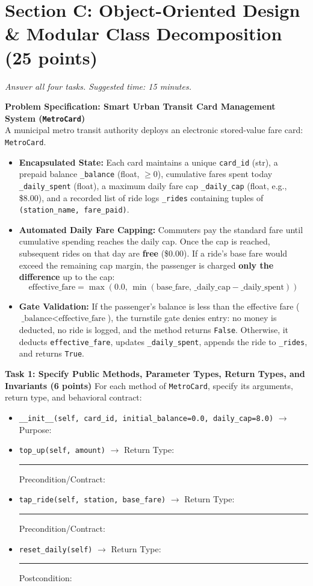 \documentclass[11pt,a4paper]{article}
\begin{document}
\section*{Section C: Object-Oriented Design \& Modular Class Decomposition \hfill \normalsize\normalfont(25 points)}
\textit{Answer all four tasks. Suggested time: 15 minutes.}
\begin{tcolorbox}[colback=boxbg,colframe=secondaryteal,arc=1.5mm,boxrule=0.6pt,top=1.5mm,bottom=1.5mm]
\textbf{Problem Specification: Smart Urban Transit Card Management System (\texttt{MetroCard})}\\[0.5mm]
\small
A municipal metro transit authority deploys an electronic stored-value fare card: \texttt{MetroCard}.
\begin{itemize}
\item \textbf{Encapsulated State:} Each card maintains a unique \texttt{card\_id} (str), a prepaid balance \texttt{\_balance} (float, $\ge 0$), cumulative fares spent today \texttt{\_daily\_spent} (float), a maximum daily fare cap \texttt{\_daily\_cap} (float, e.g., \$8.00), and a recorded list of ride logs \texttt{\_rides} containing tuples of \texttt{(station\_name, fare\_paid)}.
\item \textbf{Automated Daily Fare Capping:} Commuters pay the standard fare until cumulative spending reaches the daily cap. Once the cap is reached, subsequent rides on that day are \textbf{free} (\$0.00). If a ride's base fare would exceed the remaining cap margin, the passenger is charged \textbf{only the difference} up to the cap:
$$\text{effective\_fare} = \max\left(0.0, \, \min(\text{base\_fare}, \, \text{\_daily\_cap} - \text{\_daily\_spent})\right)$$
\item \textbf{Gate Validation:} If the passenger's balance is less than the effective fare ($\text{\_balance} < \text{effective\_fare}$), the turnstile gate denies entry: no money is deducted, no ride is logged, and the method returns \texttt{False}. Otherwise, it deducts \texttt{effective\_fare}, updates \texttt{\_daily\_spent}, appends the ride to \texttt{\_rides}, and returns \texttt{True}.
\end{itemize}
\end{tcolorbox}
\vspace{0.5mm}
\textbf{Task 1: Specify Public Methods, Parameter Types, Return Types, and Invariants (6 points)}
For each method of \texttt{MetroCard}, specify its arguments, return type, and behavioral contract:
\begin{itemize}[leftmargin=1.8em,itemsep=2pt]
\item \texttt{\_\_init\_\_(self, card\_id, initial\_balance=0.0, daily\_cap=8.0)} $\rightarrow$ Purpose: \dotfill
\item \texttt{top\_up(self, amount)} $\rightarrow$ Return Type: \rule{2.8cm}{0.4pt} \quad Precondition/Contract: \dotfill
\item \texttt{tap\_ride(self, station, base\_fare)} $\rightarrow$ Return Type: \rule{2.5cm}{0.4pt} \quad Precondition/Contract: \dotfill
\item \texttt{reset\_daily(self)} $\rightarrow$ Return Type: \rule{2.8cm}{0.4pt} \quad Postcondition: \dotfill
\end{itemize}
\end{document}
